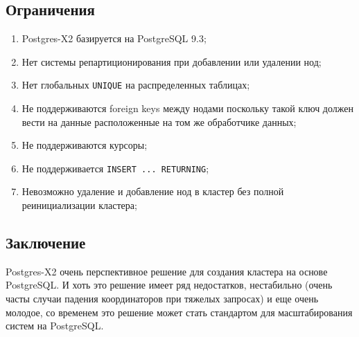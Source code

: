 \subsection{Ограничения}

\begin{enumerate}
  \item Postgres-X2 базируется на PostgreSQL 9.3;
  \item Нет системы репартиционирования при добавлении или удалении нод;
  \item Нет глобальных \lstinline!UNIQUE! на распределенных таблицах;
  \item Не поддерживаются foreign keys между нодами поскольку такой ключ должен вести на данные расположенные на том же обработчике данных;
  \item Не поддерживаются курсоры;
  \item Не поддерживается \lstinline!INSERT ... RETURNING!;
  \item Невозможно удаление и добавление нод в кластер без полной реинициализации кластера;
\end{enumerate}

\subsection{Заключение}

Postgres-X2 очень перспективное решение для создания кластера на основе PostgreSQL. И хоть это решение имеет ряд недостатков, нестабильно (очень часты случаи падения координаторов при тяжелых запросах) и еще очень молодое, со временем это решение может стать стандартом для масштабирования систем на PostgreSQL.
